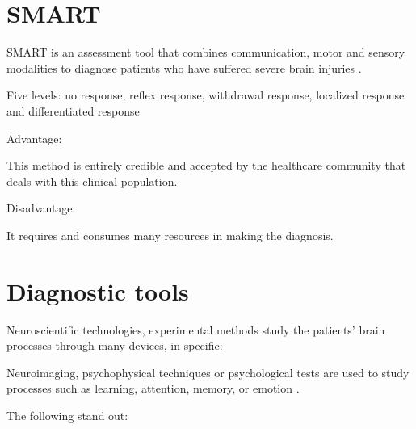\section{SMART} \label{sec:smart}

SMART is an assessment tool that combines communication, motor and sensory modalities to diagnose patients who have suffered severe brain injuries \citep{DaConceicaoTeixeira2018}.

Five levels: no response, reflex response, withdrawal response, localized response and differentiated response

Advantage:

This method is entirely credible and accepted by the healthcare community that deals with this clinical population.


Disadvantage:


It requires and consumes many resources in making the diagnosis.

\section{Diagnostic tools} \label{Diagnostic}

Neuroscientific technologies, experimental methods study the patients' brain processes through many devices, in specific: 

Neuroimaging, psychophysical techniques or psychological tests are used to study processes such as learning, attention, memory, or emotion \cite{Corchs2019}.
\espaco

The following stand out:


